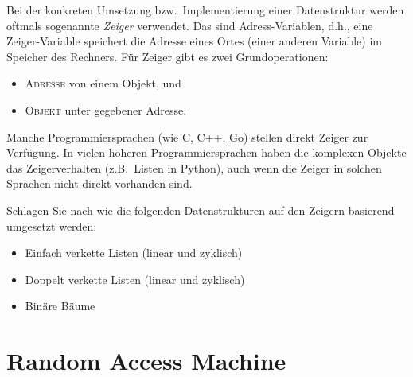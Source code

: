 \begin{bem} 
Bei der konkreten Umsetzung bzw.~Implementierung einer Datenstruktur werden oftmals sogenannte \emph{Zeiger} verwendet.
Das sind Adress-Variablen, d.h., eine Zeiger-Variable speichert die Adresse eines Ortes (einer anderen Variable) im Speicher des Rechners.
Für Zeiger gibt es zwei Grundoperationen: 
\begin{itemize}
	\item \textsc{Adresse} von einem Objekt, und 
	\item \textsc{Objekt} unter gegebener Adresse.
\end{itemize} 	
Manche Programmiersprachen (wie C, C++, Go) stellen direkt Zeiger zur Verfügung. 
	 In vielen höheren Programmiersprachen haben die komplexen Objekte das Zeigerverhalten (z.B.~Listen in Python), auch wenn die Zeiger in solchen Sprachen nicht direkt vorhanden sind. 
\end{bem} 


\begin{aufg} 
	Schlagen Sie nach wie die folgenden Datenstrukturen auf den Zeigern basierend umgesetzt werden: 
	\begin{itemize}
			\item Einfach verkette Listen (linear und zyklisch)
			\item Doppelt verkette Listen  (linear und zyklisch)
			\item Binäre Bäume
	\end{itemize} 
\end{aufg} 

\section{Random Access Machine}
\label{sect:RAM}

